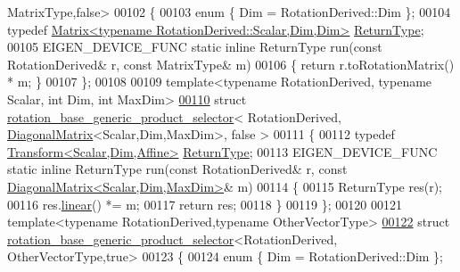 \begin{DoxyCode}
      MatrixType,false>
00102 \{
00103   \textcolor{keyword}{enum} \{ Dim = RotationDerived::Dim \};
00104   \textcolor{keyword}{typedef} \hyperlink{group___core___module_class_eigen_1_1_matrix}{Matrix<typename RotationDerived::Scalar,Dim,Dim>} 
      \hyperlink{group___core___module_class_eigen_1_1_matrix}{ReturnType};
00105   EIGEN\_DEVICE\_FUNC \textcolor{keyword}{static} \textcolor{keyword}{inline} ReturnType run(\textcolor{keyword}{const} RotationDerived& r, \textcolor{keyword}{const} MatrixType& m)
00106   \{ \textcolor{keywordflow}{return} r.toRotationMatrix() * m; \}
00107 \};
00108 
00109 \textcolor{keyword}{template}<\textcolor{keyword}{typename} RotationDerived, \textcolor{keyword}{typename} Scalar, \textcolor{keywordtype}{int} Dim, \textcolor{keywordtype}{int} MaxDim>
\hyperlink{struct_eigen_1_1internal_1_1rotation__base__generic__product__selector_3_01_rotation_derived_00_7e855ad9d8f41d04ee2e0f10c5040984}{00110} \textcolor{keyword}{struct }\hyperlink{struct_eigen_1_1internal_1_1rotation__base__generic__product__selector}{rotation\_base\_generic\_product\_selector}< RotationDerived, 
      \hyperlink{group___core___module_class_eigen_1_1_diagonal_matrix}{DiagonalMatrix}<Scalar,Dim,MaxDim>, false >
00111 \{
00112   \textcolor{keyword}{typedef} \hyperlink{group___geometry___module_class_eigen_1_1_transform}{Transform<Scalar,Dim,Affine>} \hyperlink{group___geometry___module_class_eigen_1_1_transform}{ReturnType};
00113   EIGEN\_DEVICE\_FUNC \textcolor{keyword}{static} \textcolor{keyword}{inline} ReturnType run(\textcolor{keyword}{const} RotationDerived& r, \textcolor{keyword}{const} 
      \hyperlink{group___core___module_class_eigen_1_1_diagonal_matrix}{DiagonalMatrix<Scalar,Dim,MaxDim>}& m)
00114   \{
00115     ReturnType res(r);
00116     res.\hyperlink{group___geometry___module_a535bd63d047c2a36585c3f9b62219a1e}{linear}() *= m;
00117     \textcolor{keywordflow}{return} res;
00118   \}
00119 \};
00120 
00121 \textcolor{keyword}{template}<\textcolor{keyword}{typename} RotationDerived,\textcolor{keyword}{typename} OtherVectorType>
\hyperlink{struct_eigen_1_1internal_1_1rotation__base__generic__product__selector_3_01_rotation_derived_00_945228ddac360fee065f79280b8a793b}{00122} \textcolor{keyword}{struct }\hyperlink{struct_eigen_1_1internal_1_1rotation__base__generic__product__selector}{rotation\_base\_generic\_product\_selector}<RotationDerived,
      OtherVectorType,true>
00123 \{
00124   \textcolor{keyword}{enum} \{ Dim = RotationDerived::Dim \};

\end{DoxyCode}

